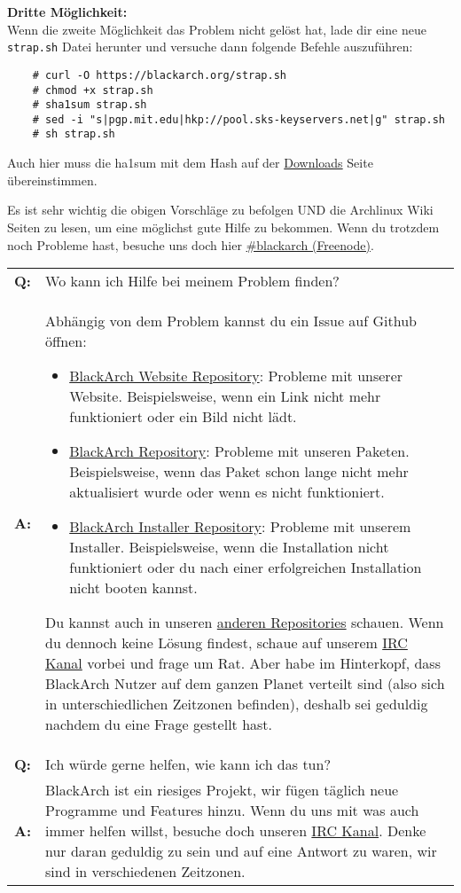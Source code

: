 \textbf{Dritte Möglichkeit:}\\
Wenn die zweite Möglichkeit das Problem nicht gelöst hat, lade dir eine neue \texttt{strap.sh} Datei herunter und versuche dann folgende Befehle auszuführen:
\begin{lstlisting}
	# curl -O https://blackarch.org/strap.sh
	# chmod +x strap.sh
	# sha1sum strap.sh
	# sed -i "s|pgp.mit.edu|hkp://pool.sks-keyservers.net|g" strap.sh
	# sh strap.sh
\end{lstlisting}
Auch hier muss die ha1sum mit dem Hash auf der \href{https://blackarch.org/downloads.html}{Downloads} Seite übereinstimmen.

Es ist sehr wichtig die obigen Vorschläge zu befolgen UND die Archlinux Wiki Seiten zu lesen, um eine möglichst gute Hilfe zu bekommen. Wenn du trotzdem noch Probleme hast, besuche uns doch hier \href{irc://irc.freenode.net/blackarch}{\#blackarch (Freenode)}.

\begin{tabularx}{\linewidth}{lX}
	\textbf{Q:} & Wo kann ich Hilfe bei meinem Problem finden? \vspace{0.2cm} \\
	\textbf{A:} & Abhängig von dem Problem kannst du ein Issue auf Github öffnen:
	\begin{itemize}
		\item \href{https://github.com/BlackArch/blackarch-site/issues}{BlackArch Website Repository}: Probleme mit unserer Website. Beispielsweise, wenn ein Link nicht mehr funktioniert oder ein Bild nicht lädt.
		\item \href{https://github.com/BlackArch/blackarch/issues}{BlackArch Repository}: Probleme mit unseren Paketen. Beispielsweise, wenn das Paket schon lange nicht mehr aktualisiert wurde oder wenn es nicht funktioniert.
		\item \href{https://github.com/BlackArch/blackarch-installer}{BlackArch Installer Repository}: Probleme mit unserem Installer. Beispielsweise, wenn die Installation nicht funktioniert oder du nach einer erfolgreichen Installation nicht booten kannst.
	\end{itemize}
Du kannst auch in unseren \href{https://github.com/BlackArch}{anderen Repositories} schauen.
Wenn du dennoch keine Lösung findest, schaue auf unserem \href{irc://irc.freenode.net/blackarch}{IRC Kanal}  vorbei und frage um Rat. Aber habe im Hinterkopf, dass BlackArch Nutzer auf dem ganzen Planet verteilt sind (also sich in unterschiedlichen Zeitzonen befinden), deshalb sei geduldig nachdem du eine Frage gestellt hast.
	\vspace{0.7cm} \\
	\textbf{Q:} & Ich würde gerne helfen, wie kann ich das tun? \vspace{0.2cm} \\
	\textbf{A:} & BlackArch ist ein riesiges Projekt, wir fügen täglich neue Programme und Features hinzu. Wenn du uns mit was auch immer helfen willst, besuche doch unseren \href{irc://irc.freenode.net/blackarch}{IRC Kanal}. Denke nur daran geduldig zu sein und auf eine Antwort zu waren, wir sind in verschiedenen Zeitzonen.
	\vspace{0.7cm} \\
\end{tabularx}

